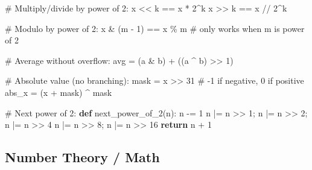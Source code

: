 \documentclass[11pt]{article}
\newenvironment{Shaded}{\begin{snugshade}}{\end{snugshade}}
\newcommand{\CommentTok}[1]{\textcolor[rgb]{0.48,0.49,0.49}{#1}}
\newcommand{\ControlFlowTok}[1]{\textcolor[rgb]{0.99,0.74,0.29}{\textbf{#1}}}
\newcommand{\DecValTok}[1]{\textcolor[rgb]{0.96,0.45,0.00}{#1}}
\newcommand{\KeywordTok}[1]{\textcolor[rgb]{0.81,0.81,0.76}{\textbf{#1}}}
\newcommand{\NormalTok}[1]{\textcolor[rgb]{0.81,0.81,0.76}{#1}}
\newcommand{\OperatorTok}[1]{\textcolor[rgb]{0.81,0.81,0.76}{#1}}
\begin{document}

\begin{Shaded}
\begin{Highlighting}[]
\CommentTok{\# Multiply/divide by power of 2:}
\NormalTok{x }\OperatorTok{\textless{}\textless{}}\NormalTok{ k  }\OperatorTok{==}\NormalTok{ x }\OperatorTok{*} \DecValTok{2}\OperatorTok{\^{}}\NormalTok{k}
\NormalTok{x }\OperatorTok{\textgreater{}\textgreater{}}\NormalTok{ k  }\OperatorTok{==}\NormalTok{ x }\OperatorTok{//} \DecValTok{2}\OperatorTok{\^{}}\NormalTok{k}

\CommentTok{\# Modulo by power of 2:}
\NormalTok{x }\OperatorTok{\&}\NormalTok{ (m }\OperatorTok{{-}} \DecValTok{1}\NormalTok{) }\OperatorTok{==}\NormalTok{ x }\OperatorTok{\%}\NormalTok{ m   }\CommentTok{\# only works when m is power of 2}

\CommentTok{\# Average without overflow:}
\NormalTok{avg }\OperatorTok{=}\NormalTok{ (a }\OperatorTok{\&}\NormalTok{ b) }\OperatorTok{+}\NormalTok{ ((a }\OperatorTok{\^{}}\NormalTok{ b) }\OperatorTok{\textgreater{}\textgreater{}} \DecValTok{1}\NormalTok{)}

\CommentTok{\# Absolute value (no branching):}
\NormalTok{mask }\OperatorTok{=}\NormalTok{ x }\OperatorTok{\textgreater{}\textgreater{}} \DecValTok{31}   \CommentTok{\# {-}1 if negative, 0 if positive}
\NormalTok{abs\_x }\OperatorTok{=}\NormalTok{ (x }\OperatorTok{+}\NormalTok{ mask) }\OperatorTok{\^{}}\NormalTok{ mask}

\CommentTok{\# Next power of 2:}
\KeywordTok{def}\NormalTok{ next\_power\_of\_2(n):}
\NormalTok{    n }\OperatorTok{{-}=} \DecValTok{1}
\NormalTok{    n }\OperatorTok{|=}\NormalTok{ n }\OperatorTok{\textgreater{}\textgreater{}} \DecValTok{1}\OperatorTok{;}\NormalTok{ n }\OperatorTok{|=}\NormalTok{ n }\OperatorTok{\textgreater{}\textgreater{}} \DecValTok{2}\OperatorTok{;}\NormalTok{ n }\OperatorTok{|=}\NormalTok{ n }\OperatorTok{\textgreater{}\textgreater{}} \DecValTok{4}
\NormalTok{    n }\OperatorTok{|=}\NormalTok{ n }\OperatorTok{\textgreater{}\textgreater{}} \DecValTok{8}\OperatorTok{;}\NormalTok{ n }\OperatorTok{|=}\NormalTok{ n }\OperatorTok{\textgreater{}\textgreater{}} \DecValTok{16}
    \ControlFlowTok{return}\NormalTok{ n }\OperatorTok{+} \DecValTok{1}
\end{Highlighting}
\end{Shaded}

\subsection{Number Theory / Math}\label{number-theory--math}
\end{document}
